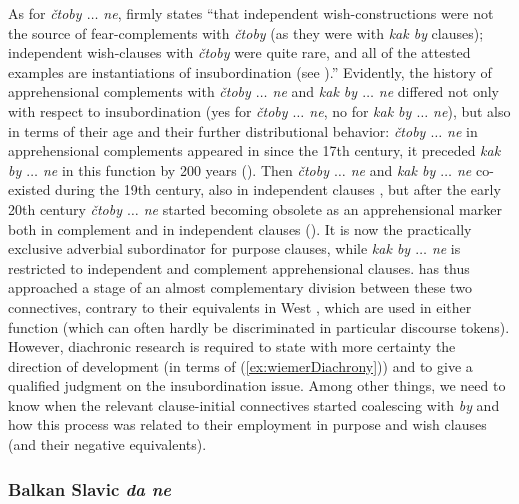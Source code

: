 \documentclass[output=paper,colorlinks,citecolor=brown]{langscibook}
\begin{document}
 As for  \textit{čtoby $\ldots$ ne}, \citet[142--143]{dobrushina2021} firmly states ``that independent wish-constructions were not the source of fear-complements with \textit{čtoby} (as they were with \textit{kak by} clauses); independent wish-clauses with \textit{čtoby} were quite rare, and all of the attested examples are instantiations of insubordination (see \citealt[337--346]{Dobrushina2016}).'' Evidently, the history of apprehensional complements with \textit{čtoby $\ldots$ ne} and \textit{kak by $\ldots$  ne} differed not only with respect to insubordination (yes for \textit{čtoby $\ldots$  ne}, no for \textit{kak by $\ldots$ ne}), but also in terms of their age and their further distributional behavior: \textit{čtoby $\ldots$  ne} in apprehensional complements appeared in  since the 17th century, it preceded \textit{kak by $\ldots$  ne} in this function by 200 years (\citealt[142--143]{dobrushina2021}). Then \textit{čtoby $\ldots$  ne} and \textit{kak by $\ldots$  ne} co-existed during the 19th century, also in independent clauses \citep[341]{Dobrushina2016}, but after the early 20th century \textit{čtoby $\ldots$  ne} started becoming obsolete as an apprehensional marker both in complement and in independent clauses (\citealt[58--60]{Nilsson2012}). It is now the practically exclusive adverbial subordinator for purpose clauses, while \textit{kak by $\ldots$  ne} is restricted to independent and complement apprehensional clauses.  has thus approached a stage of an almost complementary division between these two connectives, contrary to their equivalents in West , which are used in either function (which can often hardly be discriminated in particular discourse tokens). However, diachronic research is required to state with more certainty the direction of development (in terms of (\ref{ex:wiemerDiachrony})) and to give a qualified judgment on the insubordination issue. Among other things, we need to know when the relevant clause-initial connectives started coalescing with \textit{by} and how this process was related to their employment in purpose and wish clauses (and their negative equivalents).


\subsubsection{Balkan Slavic \textit{da ne}}
\label{subsubsec:balkanslavic}
\end{document}
